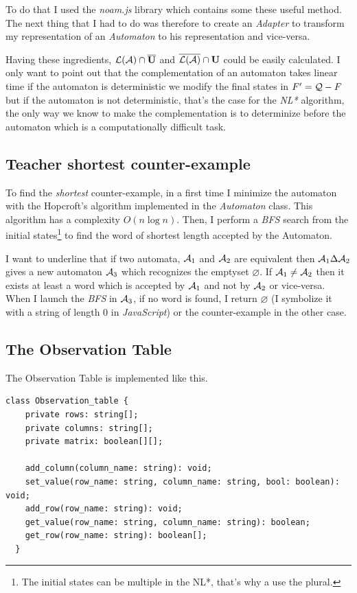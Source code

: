 To do that I used the \textit{noam.js} library which contains some these useful method. The next thing that I had to do was therefore to create an \textit{Adapter} to transform my representation of an \textit{Automaton} to his representation and vice-versa.

Having these ingredients, $\mathcal{L}(\mathcal{A}) \cap \overline{\mathbf{U}}$ and $\overline{\mathcal{L}(\mathcal{A})} \cap \mathbf{U}$ could be easily calculated. I only want to point out that the complementation of an automaton takes linear time if the automaton is deterministic we modify the final states in $F' = \mathcal{Q} - F$ but if the automaton is not deterministic, that's the case for the \textit{NL*} algorithm, the only way we know to make the complementation is to determinize before the automaton which is a computationally difficult task.

\subsection{Teacher shortest counter-example}
To find the \textit{shortest} counter-example, in a first time I minimize the automaton with the Hopcroft's algorithm implemented in the \textit{Automaton} class. This algorithm has a complexity $O(n \log n)$. Then, I perform a \textit{BFS} search from the initial states\footnote{The initial states can be multiple in the NL*, that's why a use the plural.} to find the word of shortest length accepted by the Automaton.

I want to underline that if two automata, $\mathcal{A}_1$ and $\mathcal{A}_2$ are equivalent then $\mathcal{A}_1 \Delta \mathcal{A}_2$ gives a new automaton $\mathcal{A}_3$ which recognizes the emptyset $\varnothing$. If $\mathcal{\mathcal{A}}_1 \neq \mathcal{\mathcal{A}}_2$ then it exists at least a word which is accepted by $\mathcal{A}_1$ and not by $\mathcal{A}_2$ or vice-versa. When I launch the \textit{BFS} in $\mathcal{A}_3$, if no word is found, I return $\varnothing$ (I symbolize it with a string of length 0 in \textit{JavaScript}) or the counter-example in the other case.

\subsection{The Observation Table}
The Observation Table is implemented like this.

\begin{lstlisting}[caption = Observation\_table class]
  class Observation_table {
    private rows: string[];
    private columns: string[];
    private matrix: boolean[][];
  
    add_column(column_name: string): void;
    set_value(row_name: string, column_name: string, bool: boolean): void;
    add_row(row_name: string): void;
    get_value(row_name: string, column_name: string): boolean;
    get_row(row_name: string): boolean[];
  }
  \end{lstlisting}

